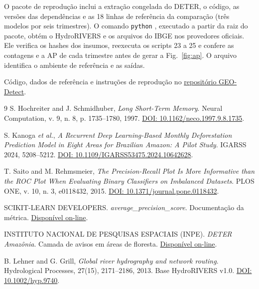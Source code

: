 \documentclass[a4paper,conference]{IEEEtran}
\begin{document}
O pacote de reprodução inclui a extração congelada do DETER, o código, as versões das dependências e as 18 linhas de referência da comparação (três modelos por seis trimestres). O comando \texttt{python} , executado a partir da raiz do pacote, obtém o HydroRIVERS e os arquivos do IBGE nos provedores oficiais. Ele verifica os hashes dos insumos, reexecuta os scripts 23 a 25 e confere as contagens e a AP de cada trimestre antes de gerar a Fig.~\ref{fig:ap}. O arquivo  identifica o ambiente de referência e as saídas.

Código, dados de referência e instruções de reprodução no \href{https://github.com/HenriqueBuzin/GEO-Detect}{repositório GEO-Detect}.

\begin{thebibliography}{9}
 S. Hochreiter and J. Schmidhuber, \emph{Long Short-Term Memory}. Neural Computation, v. 9, n. 8, p. 1735--1780, 1997. \href{https://doi.org/10.1162/neco.1997.9.8.1735}{DOI: 10.1162/neco.1997.9.8.1735}.

 S. Kanoga \emph{et al.}, \emph{A Recurrent Deep Learning-Based Monthly Deforestation Prediction Model in Eight Areas for Brazilian Amazon: A Pilot Study}. IGARSS 2024, 5208--5212. \href{https://doi.org/10.1109/IGARSS53475.2024.10642628}{DOI: 10.1109/IGARSS53475.2024.10642628}.

 T. Saito and M. Rehmsmeier, \emph{The Precision-Recall Plot Is More Informative than the ROC Plot When Evaluating Binary Classifiers on Imbalanced Datasets}. PLOS ONE, v. 10, n. 3, e0118432, 2015. \href{https://doi.org/10.1371/journal.pone.0118432}{DOI: 10.1371/journal.pone.0118432}.

 SCIKIT-LEARN DEVELOPERS. \emph{average\_precision\_score}. Documentação da métrica. \href{https://scikit-learn.org/stable/modules/generated/sklearn.metrics.average_precision_score.html}{Disponível on-line}.

 INSTITUTO NACIONAL DE PESQUISAS ESPACIAIS (INPE). \emph{DETER Amazônia}. Camada de avisos em áreas de floresta. \href{https://terrabrasilis.dpi.inpe.br/downloads/}{Disponível on-line}.

 B. Lehner and G. Grill, \emph{Global river hydrography and network routing}. Hydrological Processes, 27(15), 2171--2186, 2013. Base HydroRIVERS v1.0. \href{https://doi.org/10.1002/hyp.9740}{DOI: 10.1002/hyp.9740}.


\end{thebibliography}
\end{document}
